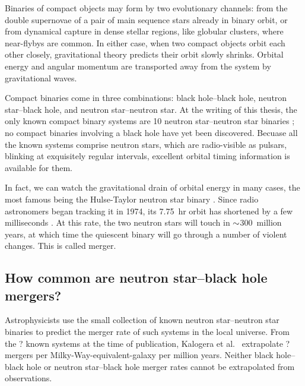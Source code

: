 Binaries of compact objects may form by two evolutionary channels: from the
double supernovae of a pair of main sequence stars already in binary orbit,
or from dynamical capture in dense stellar regions, like globular clusters,
where near-flybys are common.
In either case, when two compact objects orbit each other closely, gravitational
theory predicts their orbit slowly shrinks. Orbital energy and angular momentum
are transported away from the system by gravitational waves.

Compact binaries come in three combinations: black hole--black hole, neutron
star--black hole, and neutron star--neutron star. At the writing of this thesis,
the only known compact binary systems are 10 neutron star--neutron star binaries
\citep{post2014-evolution_compact_binaries}; no compact binaries involving a
black hole have yet been discovered.
Becuase all the known systems comprise neutron stars, which are radio-visible as
pulsars, blinking at exquisitely regular intervals, excellent orbital timing
information is available for them.

In fact, we can watch the gravitational drain of orbital energy in many
cases, the most famous being the Hulse-Taylor neutron star binary
\citep{huls1975-discovery}.
Since radio astronomers began tracking it in 1974, its 7.75~hr orbit has
shortened by a few milliseconds \citep{weis2010-hulse_taylor_timing}.
At this rate, the two neutron stars will touch in $\mathord{\sim}$300~million years,
at which time the quiescent binary will go through a number of violent changes.
This is called merger.

\subsection{How common are neutron star--black hole mergers?}

Astrophysicists use the small collection of known neutron star--neutron star
binaries to predict the merger rate of such systems in the local universe.
From the ? known systems at the time of publication, Kalogera et al.\
\citeyearpar{kalo2004-bns_merger_rate, kalo2004-erratum} extrapolate ?
\todo{fill in}
mergers per Milky-Way-equivalent-galaxy per million years.
Neither black hole--black hole or neutron star--black hole merger rates cannot
be extrapolated from observations.

